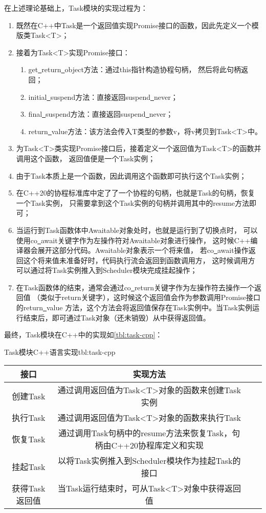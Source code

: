 \documentclass[supercite]{HustGraduPaper}
\newcommand{\rtbl}[1]{\autoref{tbl:#1}}
\theoremstyle{definition}
\begin{document}
在上述理论基础上，Task模块的实现过程为：
\begin{enumerate}[label={(\arabic*)}]
  \item 既然在C++中Task是一个返回值实现Promise接口的函数，因此先定义一个模版类Task<T>；
  \item 接着为Task<T>实现Promise接口：
    \begin{enumerate}
      \item get\underline{~}return\underline{~}object方法：通过this指针构造协程句柄，
        然后将此句柄返回；
      \item initial\underline{~}suspend方法：直接返回suspend\underline{~}never；
      \item final\underline{~}suspend方法：直接返回suspend\underline{~}never；
      \item return\underline{~}value方法：该方法会传入T类型的参数v，将v拷贝到Task<T>中。
    \end{enumerate}
  \item 为Task<T>类实现Promise接口后，接着定义一个返回值为Task<T>的函数并调用这个函数，
    返回值便是一个Task实例；
  \item 由于Task本质上是一个函数，因此调用这个函数即可执行这个Task实例；
  \item 在C++20的协程标准库中定了了一个协程的句柄，也就是Task的句柄，恢复一个Task实例，
    只需要拿到这个Task实例的句柄并调用其中的resume方法即可；
  \item 当运行到Task函数体中Awaitable对象处时，也就是运行到了切换点时，
    可以使用co\underline{~}await关键字作为左操作符对Awaitable对象进行操作，
    这时候C++编译器会展开这部分代码。Awaitable对象表示一个将来值，
    若co\underline{~}await操作返回这个将来值未准备好时，代码执行流会返回到函数调用方，
    这时候调用方可以通过将Task实例推入到Scheduler模块完成挂起操作；
  \item 在Task函数体的结束，通常会通过co\underline{~}return关键字作为左操作符去操作一个返回值
    （类似于return关键字），这时候这个返回值会作为参数调用Promise接口的return\underline{~}value
    方法，这个方法会将返回值保存在Task实例中。当Task实例运行结束后，即可通过Task对象（还未销毁）从中获得返回值。
\end{enumerate}

最终，Task模块在C++中的实现如\rtbl{task-cpp}：

\begin{generaltab}{Task模块C++语言实现}{tbl:task-cpp}
  \begin{tabular}{c|ccc}
    \toprule
    接口 & 实现方法 \\
    \midrule
    创建Task & 通过调用返回值为Task<T>对象的函数来创建Task实例\\
    执行Task & 通过调用返回值为Task<T>对象的函数来执行Task\\
    恢复Task & 通过调用Task句柄中的resume方法来恢复Task，句柄由C++20协程库定义和实现\\
    挂起Task & 以将Task实例推入到Scheduler模块作为挂起Task的接口 \\
    获得Task返回值 & 当Task运行结束时，可从Task<T>对象中获得返回值 \\
    \bottomrule
  \end{tabular}
\end{generaltab}
\end{document}
